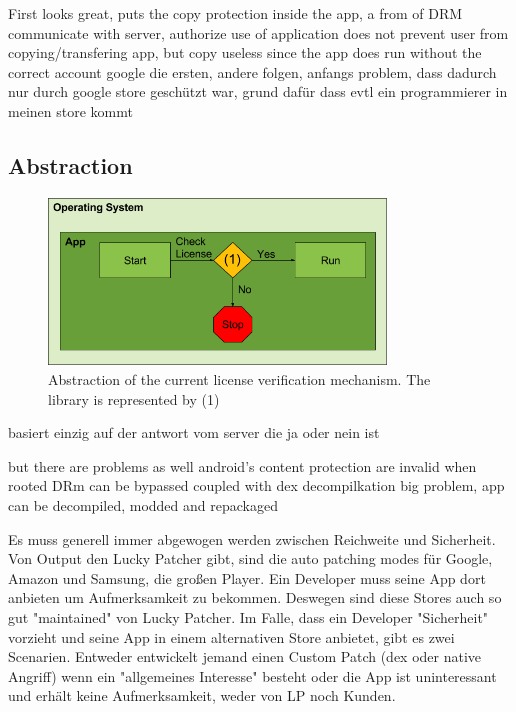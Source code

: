First looks great, puts the copy protection inside the app, a from of DRM\newline
communicate with server, authorize use of application\newline
does not prevent user from copying/transfering app, but copy useless since the app does run without the correct account\newline
google die ersten, andere folgen, anfangs problem, dass dadurch nur durch google store geschützt war, grund dafür dass evtl ein programmierer in meinen store kommt\newline

\subsection{Abstraction} \label{section:license-abstraction}
\begin{figure}[h]
    \centering
    \includegraphics[width=0.8\textwidth]{data/verificationNow.png}
    \caption{Abstraction of the current license verification mechanism. The library is represented by (1)}
    \label{fig:verificationNow}
\end{figure}


basiert einzig auf der antwort vom server die ja oder nein ist


but there are problems as well
android's content protection are invalid when rooted
DRm can be bypassed
coupled with dex decompilkation big problem, app can be decompiled, modded and repackaged\cite{levinAndevcon}



Es muss generell immer abgewogen werden zwischen Reichweite und Sicherheit. Von Output den Lucky Patcher gibt, sind die auto patching modes für Google, Amazon und Samsung, die großen Player. Ein Developer muss seine App dort anbieten um Aufmerksamkeit zu bekommen. Deswegen sind diese Stores auch so gut "maintained" von Lucky Patcher.
Im Falle, dass ein Developer "Sicherheit" vorzieht und seine App in einem alternativen Store anbietet, gibt es zwei Scenarien. Entweder entwickelt jemand einen Custom Patch (dex oder native Angriff) wenn ein "allgemeines Interesse" besteht oder die App ist uninteressant und erhält keine Aufmerksamkeit, weder von LP noch Kunden.
